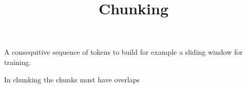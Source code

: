 \documentclass[a4paper]{article}
\title{Chunking}
\date{}
\begin{document}
    \maketitle
    A consequitive sequence of tokens to build for example a sliding window for training.
    
    In chunking the chunks must have overlaps
\end{document}
